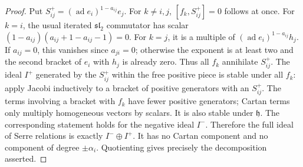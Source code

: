 \begin{proof}
Put \(S^+_{ij}=(\operatorname{ad}e_i)^{1-a_{ij}}e_j\).
For \(k\ne i,j\), \([f_k,S^+_{ij}]=0\) follows at once.
For \(k=i\), the usual iterated \(\mathfrak{sl}_2\)
commutator has scalar
\((1-a_{ij})(a_{ij}+1-a_{ij}-1)=0\).
For \(k=j\), it is a multiple of
\((\operatorname{ad}e_i)^{1-a_{ij}}h_j\).
If \(a_{ij}=0\), this vanishes since \(a_{ji}=0\);
otherwise the exponent is at least two and the second
bracket of \(e_i\) with \(h_j\) is already zero.
Thus all \(f_k\) annihilate \(S^+_{ij}\).
The ideal \(I^+\) generated by the \(S^+_{ij}\) within the
free positive piece is stable under all \(f_k\): apply Jacobi
inductively to a bracket of positive generators with an
\(S^+_{ij}\). The terms involving a bracket with \(f_k\)
have fewer positive generators; Cartan terms only multiply
homogeneous vectors by scalars. It is also stable under
\(\mathfrak h\). The corresponding statement holds for
the negative ideal \(I^-\).
Therefore the full ideal of Serre relations is exactly
\(I^-\oplus I^+\). It has no Cartan component and no
component of degree \(\pm\alpha_i\).
Quotienting gives precisely the decomposition asserted.
\end{proof}

